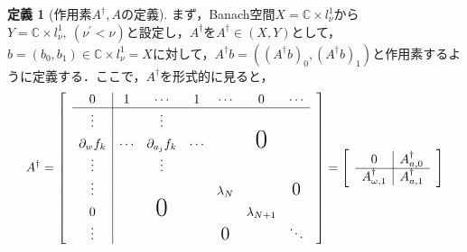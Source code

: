 \documentclass[11pt,a4paper,titlepage]{jsreport}
\theoremstyle{definition}
\newtheorem{dfn}{定義}
\begin{document}
\begin{dfn}[作用素$A^\dagger,A$の定義]
  まず，Banach空間$X=\mathbb{C}\times l_\nu^1$から$Y=\mathbb{C}\times l_\nu^1,\ (\nu^\prime<\nu)$と設定し，$A^\dagger$を$A^\dagger\in (X,Y)$として，$b=(b_0,b_1)\in \mathbb{C}\times l_\nu^1=X$に対して，$A^\dagger b=\left(\left(A^\dagger b\right)_0,\left(A^\dagger b\right)_1\right)$と作用素するように定義する．ここで，$A^\dagger$を形式的に見ると，
  \begin{equation*}
    A^\dagger =
    \begin{bmatrix}
       & \multicolumn{1}{c|}{0}              & 1      & \cdots            & 1      & \cdots           & 0               & \cdots           & \\ \cline{2-8}
       & \multicolumn{1}{c|}{\vdots}         &        & \vdots            &        &                  &                 &                  & \\
       & \multicolumn{1}{c|}{\partial_w f_k} & \cdots & \partial_{a_j}f_k & \cdots &                  & \text{\huge{0}} &                    \\
       & \multicolumn{1}{c|}{\vdots}         &        & \vdots            &        &                  &                 &                    \\
       & \multicolumn{1}{c|}{\vdots}         &        &                   &        & \lambda_N        &                 & \text{\Large{0}} & \\
       & \multicolumn{1}{c|}{0}              &        & \text{\huge{0}}   &        &                  & \lambda_{N+1}   &                    \\
       & \multicolumn{1}{c|}{\vdots}         &        &                   &        & \text{\Large{0}} &                 & \ddots
    \end{bmatrix}
    =
    \begin{bmatrix}
       & \multicolumn{1}{c|}{0}                    & A_{a,0}^\dagger & \\ \cline{2-3}
       & \multicolumn{1}{c|}{A_{\omega,1}^\dagger} & A_{a,1}^\dagger &
    \end{bmatrix}
  \end{equation*}


\end{dfn}
\end{document}

